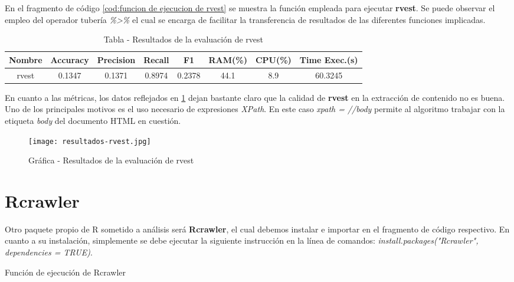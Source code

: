 En el fragmento de código \ref{cod:funcion de ejecucion de rvest} se muestra la función empleada para
ejecutar \textbf{rvest}. Se puede observar el empleo del operador tubería \emph{\%>\%} el cual se encarga
de facilitar la transferencia de resultados de las diferentes funciones implicadas.

\begin{table}[h]
    \begin{center}
      \begin{tabular}{| c | c | c | c | c | c | c | c |} \hline 
       \textbf{Nombre} & \textbf{Accuracy} & \textbf{Precision}  & \textbf{Recall} & \textbf{F1} & \textbf{RAM(\%)} & \textbf{CPU(\%)} & \textbf{Time Exec.(s)} \\ \hline
       rvest & 0.1347 & 0.1371 & 0.8974 & 0.2378 & 44.1 & 8.9 & 60.3245 \\ \hline
      \end{tabular}
      \caption{Tabla - Resultados de la evaluación de rvest}
      \label{tab:tabla - resultados de la evaluacion de rvest}
    \end{center}
\end{table}

En cuanto a las métricas, los datos reflejados en \ref{tab:tabla - resultados de la evaluacion de rvest}
dejan bastante claro que la calidad de \textbf{rvest} en la extracción de contenido no es buena. Uno de
los principales motivos es el uso necesario de expresiones \emph{XPath}. En este caso \emph{xpath = //body} 
permite al algoritmo trabajar con la etiqueta \emph{body} del documento HTML en cuestión.

\begin{figure}[tphb]
    \centering
    \texttt{[image: resultados-rvest.jpg]}
    \caption{Gráfica - Resultados de la evaluación de rvest}
    \label{img:grafica - resultados de la evaluacion de rvest}
\end{figure}

\section*{Rcrawler}

Otro paquete propio de R sometido a análisis será \textbf{Rcrawler}, el cual debemos instalar e importar
en el fragmento de código respectivo. En cuanto a su instalación, simplemente se debe ejecutar la siguiente
instrucción en la línea de comandos: \emph{install.packages("Rcrawler", dependencies = TRUE)}.

\begin{codefloat}
    
    \caption{Función de ejecución de Rcrawler}
    \label{cod:funcion de ejecucion de rcrawler}
\end{codefloat}

